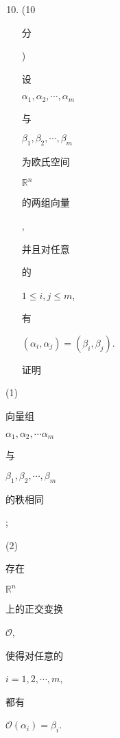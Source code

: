 \documentclass[10pt]{article}
\begin{document}
\begin{enumerate}
  \setcounter{enumi}{9}
  \item (10 \begin{CJK}{UTF8}{mj}分\end{CJK}) \begin{CJK}{UTF8}{mj}设\end{CJK} $\alpha_{1}, \alpha_{2}, \cdots, \alpha_{m}$ \begin{CJK}{UTF8}{mj}与\end{CJK} $\beta_{1}, \beta_{2}, \cdots, \beta_{m}$ \begin{CJK}{UTF8}{mj}为欧氏空间\end{CJK} $\mathbb{R}^{n}$ \begin{CJK}{UTF8}{mj}的两组向量\end{CJK}, \begin{CJK}{UTF8}{mj}并且对任意\end{CJK} \begin{CJK}{UTF8}{mj}的\end{CJK} $1 \leq i, j \leq m$, \begin{CJK}{UTF8}{mj}有\end{CJK} $\left(\alpha_{i}, \alpha_{j}\right)=\left(\beta_{i}, \beta_{j}\right)$. \begin{CJK}{UTF8}{mj}证明\end{CJK}
\end{enumerate}
(1) \begin{CJK}{UTF8}{mj}向量组\end{CJK} $\alpha_{1}, \alpha_{2}, \cdots \alpha_{m}$ \begin{CJK}{UTF8}{mj}与\end{CJK} $\beta_{1}, \beta_{2}, \cdots, \beta_{m}$ \begin{CJK}{UTF8}{mj}的秩相同\end{CJK};

(2) \begin{CJK}{UTF8}{mj}存在\end{CJK} $\mathbb{R}^{n}$ \begin{CJK}{UTF8}{mj}上的正交变换\end{CJK} $\mathscr{O}$, \begin{CJK}{UTF8}{mj}使得对任意的\end{CJK} $i=1,2, \cdots, m$, \begin{CJK}{UTF8}{mj}都有\end{CJK} $\mathscr{O}\left(\alpha_{i}\right)=\beta_{i}$.
\end{document}
